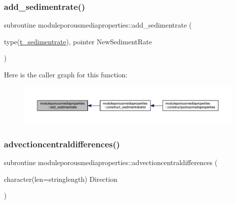 \subsubsection{\texorpdfstring{add\+\_\+sedimentrate()}{add\_sedimentrate()}}
{\footnotesize\ttfamily subroutine moduleporousmediaproperties\+::add\+\_\+sedimentrate (\begin{DoxyParamCaption}\item[{type(\mbox{\hyperlink{structmoduleporousmediaproperties_1_1t__sedimentrate}{t\+\_\+sedimentrate}}), pointer}]{New\+Sediment\+Rate }\end{DoxyParamCaption})\hspace{0.3cm}{\ttfamily [private]}}

Here is the caller graph for this function\+:\nopagebreak
\begin{figure}[H]
\begin{center}
\leavevmode
\includegraphics[width=350pt]{namespacemoduleporousmediaproperties_a4a94ca075eedbc0f235c5c681470aee8_icgraph}
\end{center}
\end{figure}
\mbox{\label{namespacemoduleporousmediaproperties_a07904791ddeab6650d5a3ed4ee8eca5d}} 
\subsubsection{\texorpdfstring{advectioncentraldifferences()}{advectioncentraldifferences()}}
{\footnotesize\ttfamily subroutine moduleporousmediaproperties\+::advectioncentraldifferences (\begin{DoxyParamCaption}\item[{character(len=stringlength)}]{Direction }\end{DoxyParamCaption})\hspace{0.3cm}{\ttfamily [private]}}

